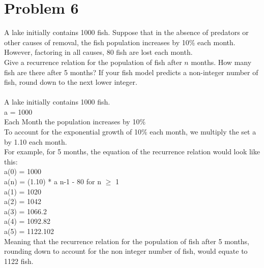   \section*{Problem 6}
A lake initially contains 1000 fish. Suppose that in the absence of predators or other causes of removal, the fish population increases by 10\% each month. However, factoring in all causes, 80 fish are lost each month.\\

Give a recurrence relation for the population of fish after $n$ months. How many fish are there after 5 months? If your fish model predicts a non-integer number of fish, round down to the next lower integer.
\\\\
  A lake initially contains 1000 fish. \\
  
  a = 1000 \\
  
  Each Month the population increases by 10$\%$ \\
  
  To account for the exponential growth of 10$\%$ each month, we multiply the set a by 1.10 each month. \\
  
  For example, for 5 months, the equation of the recurrence relation would look like this: \\
  
  a(0) = 1000 \\
  
  a(n) = (1.10) * a n-1 - 80 for n $\geq$ 1 \\
  
  a(1) =  1020 \\
  
  a(2) =  1042 \\
  
  a(3) =  1066.2 \\
  
  a(4) = 1092.82 \\
  
  a(5) = 1122.102 \\
  
  Meaning that the recurrence relation for the population of fish after 5 months, rounding down to account for the non integer number of fish, would equate to 1122 fish. 
  
  
\\\\


